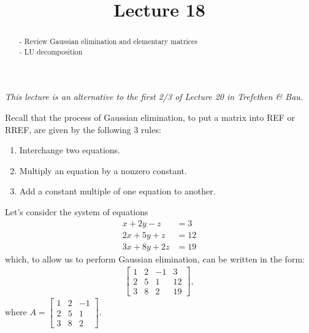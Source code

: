 \documentclass{ximera}
\begin{document}
    \title{Lecture 18}
    
    \begin{abstract} 
        - Review Gaussian elimination and elementary matrices \\
        - LU decomposition
    \end{abstract}
    \maketitle

\textit{This lecture is an alternative to the first 2/3 of Lecture 20 in Trefethen \& Bau.}

Recall that the process of Gaussian elimination, to put a matrix into REF or RREF, are given by the following 3 rules:
\begin{enumerate}
    \item  Interchange two equations.
    \item  Multiply an equation by a nonzero constant.
    \item  Add a constant multiple of one equation to another.
\end{enumerate}

Let's consider the system of equations 
\begin{align*}
    x+2y-z &= 3 \\
    2x+5y+z &=12 \\
    3x+8y+2z &=19
\end{align*}
which, to allow us to perform Gaussian elimination, can be written in the form:
\begin{align*}
\left[
\begin{array}{rrr|r}
1 & 2 & -1 & 3 \\
2 & 5 & 1 & 12 \\
3 & 8 & 2 & 19
\end{array}
\right],
\end{align*}
where $A = \begin{bmatrix} 1 & 2 & -1 \\
2 & 5 & 1 \\
3 & 8 & 2\end{bmatrix}$.
\end{document}
